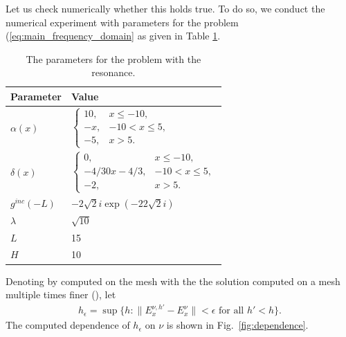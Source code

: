 Let us check numerically whether this holds true. 
To do so, we conduct the  numerical experiment with parameters for the problem (\ref{eq:main_frequency_domain} as given in Table \ref{tab:parameters}. 
\begin{table}[htb!]
\begin{tabular}{l|l}
Parameter & Value \\
\hline
$\alpha(x)$ & $\left\{\begin{array}{lr}
10, & x\leq -10,\\
-x, & -10<x\leq 5,\\
-5, & x>5.
\end{array}\right.$ \\
$\delta(x)$ & 
$\left\{\begin{array}{lr}
0, & x\leq -10,\\
-4/30x-4/3,& -10<x\leq 5,\\
-2, & x>5.
\end{array}\right.$ \\
$g^{inc}(-L)$ & $-2 \sqrt{2}i\exp(-22\sqrt{2}i)$\\
$\lambda$ & 
$\sqrt{10}$\\
$L$& 15\\
$H$ & 10 \\
\end{tabular}
\caption{The parameters for the problem with the resonance.}
\label{tab:parameters}
\end{table}
Denoting by  computed on the mesh with the  the solution computed on a mesh multiple times finer (), let 
\begin{align}
\label{eq:def_epsilon}
h_{\epsilon}=\sup\{h: \|E_{x}^{\nu,h'}-E_{x}^{\nu}\|<\epsilon \text{ for all } h'<h\}.
\end{align}
The computed dependence of $h_{\epsilon}$ on $\nu$ is shown in Fig.~\ref{fig:dependence}.
